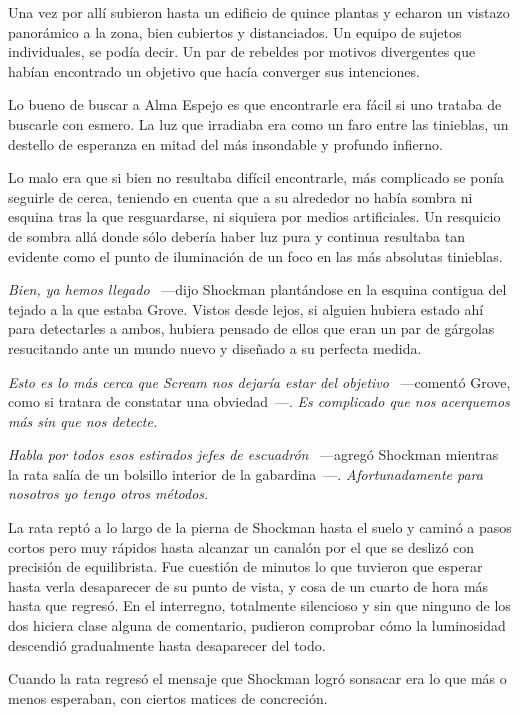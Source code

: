 Una vez por allí subieron hasta un edificio de quince plantas y echaron un vistazo panorámico a la zona, bien cubiertos y distanciados. Un equipo de sujetos individuales, se podía decir. Un par de rebeldes por motivos divergentes que habían encontrado un objetivo que hacía converger sus intenciones.

Lo bueno de buscar a Alma Espejo es que encontrarle era fácil si uno trataba de buscarle con esmero. La luz que irradiaba era como un faro entre las tinieblas, un destello de esperanza en mitad del más insondable y profundo infierno.

Lo malo era que si bien no resultaba difícil encontrarle, más complicado se ponía seguirle de cerca, teniendo en cuenta que a su alrededor no había sombra ni esquina tras la que resguardarse, ni siquiera por medios artificiales. Un resquicio de sombra allá donde sólo debería haber luz pura y continua resultaba tan evidente como el punto de iluminación de un foco en las más absolutas tinieblas.

\emph{Bien, ya hemos llegado} ~---dijo Shockman plantándose en la esquina contigua del tejado a la que estaba Grove. Vistos desde lejos, si alguien hubiera estado ahí para detectarles a ambos, hubiera pensado de ellos que eran un par de gárgolas resucitando ante un mundo nuevo y diseñado a su perfecta medida.

\emph{Esto es lo más cerca que Scream nos dejaría estar del objetivo} ~---comentó Grove, como si tratara de constatar una obviedad~---. \emph{Es complicado que nos acerquemos más sin que nos detecte.}

\emph{Habla por todos esos estirados jefes de escuadrón} ~---agregó Shockman mientras la rata salía de un bolsillo interior de la gabardina~---. \emph{Afortunadamente para nosotros yo tengo otros métodos.}

La rata reptó a lo largo de la pierna de Shockman hasta el suelo y caminó a pasos cortos pero muy rápidos hasta alcanzar un canalón por el que se deslizó con precisión de equilibrista. Fue cuestión de minutos lo que tuvieron que esperar hasta verla desaparecer de su punto de vista, y cosa de un cuarto de hora más hasta que regresó. En el interregno, totalmente silencioso y sin que ninguno de los dos hiciera clase alguna de comentario, pudieron comprobar cómo la luminosidad descendió gradualmente hasta desaparecer del todo.

Cuando la rata regresó el mensaje que Shockman logró sonsacar era lo que más o menos esperaban, con ciertos matices de concreción.

